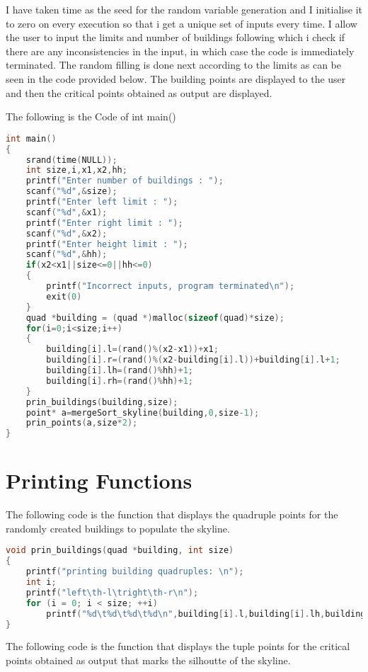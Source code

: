 \documentclass{article}
\begin{document}
I have taken time as the seed for the random variable generation and I initialise it to zero on every execution so that i get a unique set of inputs every time.
I allow the user to input the limits and number of buildings following which i check if there are any inconsistencies in the input, in which case the code is immediately terminated.
The random filling is done next according to the limits as can be seen in the code provided below.
The building points are displayed to the user and then the critical points obtained as output are displayed.

The following is the Code of int main()
\begin{lstlisting}[language=c, caption=main]
int main()
{
    srand(time(NULL));
    int size,i,x1,x2,hh;
    printf("Enter number of buildings : ");
    scanf("%d",&size);
    printf("Enter left limit : ");
    scanf("%d",&x1);
    printf("Enter right limit : ");
    scanf("%d",&x2);
    printf("Enter height limit : ");
    scanf("%d",&hh);
    if(x2<x1||size<=0||hh<=0)
    {
        printf("Incorrect inputs, program terminated\n");
        exit(0)
    }
    quad *building = (quad *)malloc(sizeof(quad)*size);
    for(i=0;i<size;i++)
    {
        building[i].l=(rand()%(x2-x1))+x1;
        building[i].r=(rand()%(x2-building[i].l))+building[i].l+1;
        building[i].lh=(rand()%hh)+1;
        building[i].rh=(rand()%hh)+1;
    }
    prin_buildings(building,size);
    point* a=mergeSort_skyline(building,0,size-1);
    prin_points(a,size*2);
}
\end{lstlisting}

\clearpage

\section{Printing Functions}

The following code is the function that displays the quadruple points for the randomly created buildings to populate the skyline.

\begin{lstlisting}[language=c, caption=print buildings]
void prin_buildings(quad *building, int size)
{
    printf("printing building quadruples: \n");
    int i;
    printf("left\th-l\tright\th-r\n");
    for (i = 0; i < size; ++i)
        printf("%d\t%d\t%d\t%d\n",building[i].l,building[i].lh,building[i].r,building[i].rh);
}
\end{lstlisting}

The following code is the function that displays the tuple points for the critical points obtained as output that marks the silhoutte of the skyline.
\end{document}
